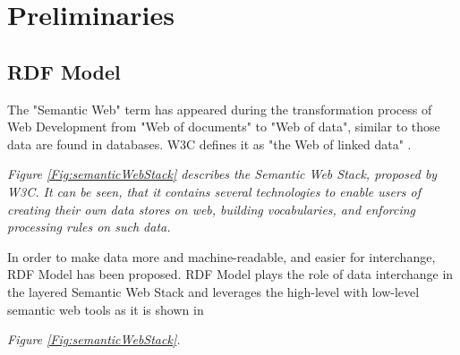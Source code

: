 \chapter{Preliminaries}
\label{ch:preliminaries}
\newpage

\section{RDF Model}
The "Semantic Web" \cite{W3C:SemanticWebTerm:Online} term  has appeared during the transformation process of Web Development from "Web of documents" to "Web of data", similar to those data are found in databases. W3C defines it as "the Web of linked data" . {\it Figure \ref{Fig:semanticWebStack} describes the Semantic Web Stack, proposed by W3C. It can be seen, that it contains several technologies to enable users of creating their own data stores on web, building vocabularies, and enforcing processing rules on such data.   
\vspace{5mm} %
\par
In order to make data more and machine-readable, and easier for interchange, RDF Model \cite{W3C:RDF-Primer:Online} has been proposed. RDF Model plays the role of data interchange in the layered Semantic Web Stack and leverages the high-level with low-level semantic web tools as it is shown in {\it Figure \ref{Fig:semanticWebStack}. 

}}
